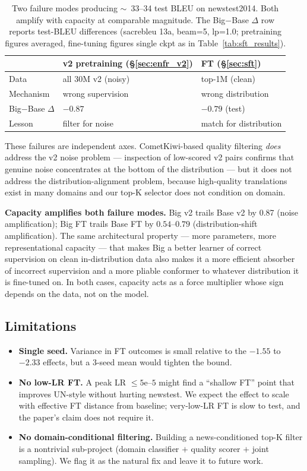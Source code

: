 \begin{table}[t]
\centering
\small
\begin{tabular}{p{2.4cm} p{2.4cm} p{2.4cm}}
\toprule
& v2 pretraining (\S\ref{sec:enfr_v2}) & FT (\S\ref{sec:sft}) \\
\midrule
Data & all 30M v2 (noisy) & top-1M (clean) \\
Mechanism & wrong supervision & wrong distribution \\
Big$-$Base $\Delta$ & $-0.87$ & $-0.79$ (test) \\
Lesson & filter for noise & match for distribution \\
\bottomrule
\end{tabular}
\caption{Two failure modes producing $\sim$~33--34 test BLEU on newstest2014. Both amplify with capacity at comparable magnitude. The Big$-$Base $\Delta$ row reports test-BLEU differences (sacrebleu 13a, beam=5, lp=1.0; pretraining figures averaged, fine-tuning figures single ckpt as in Table~\ref{tab:sft_results}).}
\label{tab:two_failures}
\end{table}

These failures are independent axes. CometKiwi-based quality filtering \emph{does} address the v2 noise problem --- inspection of low-scored v2 pairs confirms that genuine noise concentrates at the bottom of the distribution --- but it does not address the distribution-alignment problem, because high-quality translations exist in many domains and our top-K selector does not condition on domain.

\textbf{Capacity amplifies both failure modes.} Big v2 trails Base v2 by 0.87 (noise amplification); Big FT trails Base FT by $0.54$--$0.79$ (distribution-shift amplification). The same architectural property --- more parameters, more representational capacity --- that makes Big a better learner of correct supervision on clean in-distribution data also makes it a more efficient absorber of incorrect supervision and a more pliable conformer to whatever distribution it is fine-tuned on. In both cases, capacity acts as a force multiplier whose sign depends on the data, not on the model.

\subsection{Limitations}
\begin{itemize}
\item \textbf{Single seed.} Variance in FT outcomes is small relative to the $-1.55$ to $-2.33$ effects, but a 3-seed mean would tighten the bound.
\item \textbf{No low-LR FT.} A peak LR $\leq 5\text{e--}5$ might find a ``shallow FT'' point that improves UN-style without hurting newstest. We expect the effect to scale with effective FT distance from baseline; very-low-LR FT is slow to test, and the paper's claim does not require it.
\item \textbf{No domain-conditional filtering.} Building a news-conditioned top-K filter is a nontrivial sub-project (domain classifier $+$ quality scorer $+$ joint sampling). We flag it as the natural fix and leave it to future work.
\end{itemize}


